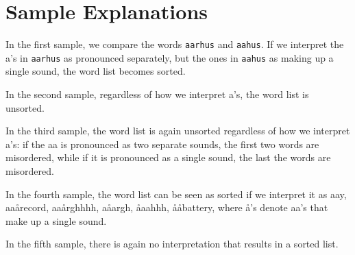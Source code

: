 \section*{Sample Explanations}
In the first sample, we compare the words \texttt{aarhus} and \texttt{aahus}.
If we interpret the a's in \texttt{aarhus} as pronounced separately, but the ones in \texttt{aahus} as making up a single sound, the word list becomes sorted.

In the second sample, regardless of how we interpret a's, the word list is unsorted.

In the third sample, the word list is again unsorted regardless of how we interpret a's:
if the aa is pronounced as two separate sounds, the first two words are misordered, while if it is pronounced as a single sound, the last the words are misordered.

In the fourth sample, the word list can be seen as sorted if we interpret it as aay, aaårecord, aaårghhhh, aåargh, åaahhh, ååbattery, where å's denote aa's that make up a single sound.

In the fifth sample, there is again no interpretation that results in a sorted list.
